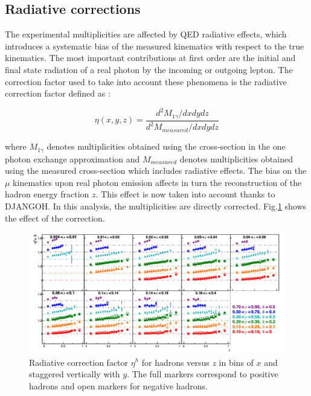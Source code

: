 \documentclass[letterpaper,12pt]{article}
\begin{document}
\subsection{Radiative corrections}

The experimental multiplicities are affected by QED radiative effects, which introduces a systematic bias of the measured kinematics with respect to the true kinematics. The most important contributions at first order are the initial and final state radiation of a real photon by the incoming or outgoing lepton. The correction factor used to take into account these phenomena is the radiative correction factor defined as :

\begin{equation}
	\eta(x,y,z) = \frac{d^2 M_{1\gamma}/dxdydz}{d^2 M_{measured}/dxdydz}
\end{equation}

where $M_{1\gamma}$ denotes multiplicities obtained using the cross-section in the one photon exchange approximation and $M_{measured}$ denotes multiplicities obtained using the measured cross-section which includes radiative effects. The bias on the $\mu$ kinematics upon real photon emission affects in turn the reconstruction of the hadron energy fraction $z$. This effect is now taken into account thanks to DJANGOH. In this analysis, the multiplicities are directly corrected. Fig.\ref{RadCor} shows the effect of the correction.

\begin{figure}
	\includegraphics[scale=0.5]{./gfx/RadCor.png}
	\caption{Radiative correction factor $\eta^{h}$ for hadrons versus $z$ in bins of $x$ and staggered vertically with $y$. The full markers correspond to positive hadrons and open markers for negative hadrons.}
	\label{RadCor}
\end{figure}

\newpage
\end{document}
